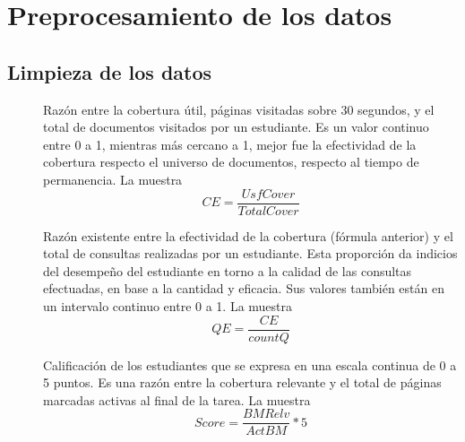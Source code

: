 \section{Preprocesamiento de los datos}

\subsection{Limpieza de los datos}
\begin{description}
	\item [] Razón entre la cobertura útil, páginas visitadas sobre 30 segundos, y el total de documentos visitados por un estudiante. Es un valor continuo entre 0 a 1, mientras más cercano a 1, mejor fue la efectividad de la cobertura respecto el universo de documentos, respecto al tiempo de permanencia. La  muestra     
	\begin{equation}
	CE = \frac{UsfCover}{TotalCover}
	\label{eq:CE}
	\end{equation}

	\item [] Razón existente entre la efectividad de la cobertura (fórmula anterior) y el total de consultas realizadas por un estudiante. Esta proporción da indicios del desempeño del estudiante en torno a la calidad de las consultas efectuadas, en base a la cantidad y eficacia. Sus valores también están en un intervalo continuo entre 0 a 1. La  muestra
	\begin{equation}
	QE = \frac{CE}{countQ}
	\label{eq:QE}
	\end{equation}

	\item [] Calificación de los estudiantes que se expresa en una escala continua de 0 a 5 puntos. Es una razón entre la cobertura relevante y el total de páginas marcadas activas al final de la tarea. La  muestra
	\begin{equation}
	Score = \frac{BMRelv}{ActBM} * 5
	\label{eq:score}
	\end{equation}
\end{description}